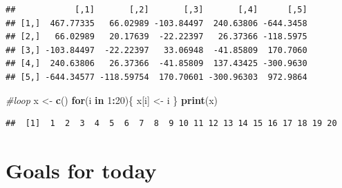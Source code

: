 \documentclass[]{book}
\newenvironment{Shaded}{\begin{snugshade}}{\end{snugshade}}
\newcommand{\KeywordTok}[1]{\textcolor[rgb]{0.13,0.29,0.53}{\textbf{#1}}}
\newcommand{\DataTypeTok}[1]{\textcolor[rgb]{0.13,0.29,0.53}{#1}}
\newcommand{\DecValTok}[1]{\textcolor[rgb]{0.00,0.00,0.81}{#1}}
\newcommand{\StringTok}[1]{\textcolor[rgb]{0.31,0.60,0.02}{#1}}
\newcommand{\CommentTok}[1]{\textcolor[rgb]{0.56,0.35,0.01}{\textit{#1}}}
\newcommand{\ControlFlowTok}[1]{\textcolor[rgb]{0.13,0.29,0.53}{\textbf{#1}}}
\newcommand{\OperatorTok}[1]{\textcolor[rgb]{0.81,0.36,0.00}{\textbf{#1}}}
\newcommand{\NormalTok}[1]{#1}
\theoremstyle{definition}
\theoremstyle{definition}
\theoremstyle{definition}
\theoremstyle{remark}
\begin{document}
\begin{Shaded}
\end{Shaded}

\begin{verbatim}
##            [,1]       [,2]       [,3]       [,4]      [,5]
## [1,]  467.77335   66.02989 -103.84497  240.63806 -644.3458
## [2,]   66.02989   20.17639  -22.22397   26.37366 -118.5975
## [3,] -103.84497  -22.22397   33.06948  -41.85809  170.7060
## [4,]  240.63806   26.37366  -41.85809  137.43425 -300.9630
## [5,] -644.34577 -118.59754  170.70601 -300.96303  972.9864
\end{verbatim}

\begin{Shaded}
\begin{Highlighting}[]
\CommentTok{#loop }
\NormalTok{x <-}\StringTok{ }\KeywordTok{c}\NormalTok{() }
\ControlFlowTok{for}\NormalTok{(i }\ControlFlowTok{in} \DecValTok{1}\OperatorTok{:}\DecValTok{20}\NormalTok{)\{}
\NormalTok{  x[i] <-}\StringTok{ }\NormalTok{i }
\NormalTok{\}}
\KeywordTok{print}\NormalTok{(x) }
\end{Highlighting}
\end{Shaded}

\begin{verbatim}
##  [1]  1  2  3  4  5  6  7  8  9 10 11 12 13 14 15 16 17 18 19 20
\end{verbatim}

\section{Goals for today}\label{goals-for-today}
\end{document}
